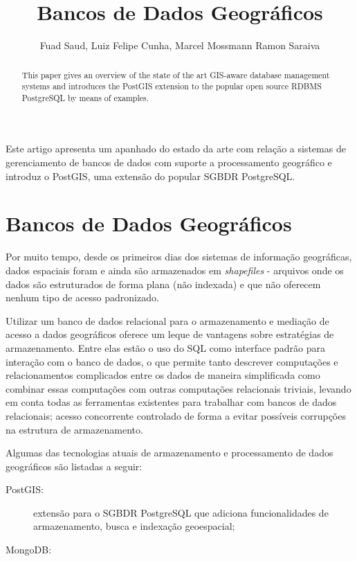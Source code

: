 \documentclass[12pt]{article}
\title{Bancos de Dados Geográficos}
\author{Fuad Saud\inst{1}, Luiz Felipe Cunha\inst{1}, Marcel Mossmann \inst{1} Ramon Saraiva\inst{1}}
\begin{document}
\maketitle

\begin{abstract}
  This paper gives an overview of the state of the art GIS-aware database
  management systems and introduces the PostGIS extension to the popular
  open source RDBMS PostgreSQL by means of examples.
\end{abstract}

\begin{resumo}
  Este artigo apresenta um apanhado do estado da arte com relação a sistemas de
  gerenciamento de bancos de dados com suporte a processamento geográfico e
  introduz o PostGIS, uma extensão do popular SGBDR PostgreSQL.
\end{resumo}


\section{Bancos de Dados Geográficos}

Por muito tempo, desde os primeiros dias dos sistemas de informação
geográficas, dados espaciais foram e ainda são armazenados em
\textit{shapefiles} - arquivos onde os dados são estruturados de forma plana
(não indexada) e que não oferecem nenhum tipo de acesso padronizado.

Utilizar um banco de dados relacional para o armazenamento e mediação de acesso
a dados geográficos oferece um leque de vantagens sobre estratégias de
armazenamento. Entre elas estão o uso do SQL como interface padrão para
interação com o banco de dados, o que permite tanto descrever computações e
relacionamentos complicados entre os dados de maneira simplificada como
combinar essas computações com outras computações relacionais triviais, levando
em conta todas as ferramentas existentes para trabalhar com bancos de dados
relacionais; acesso concorrente controlado de forma a evitar possíveis
corrupções na estrutura de armazenamento.

Algumas das tecnologias atuais de armazenamento e processamento de dados
geográficos são listadas a seguir:

\begin{description}
\item[PostGIS:] extensão para o SGBDR PostgreSQL que adiciona funcionalidades
  de armazenamento, busca e indexação geoespacial;
\item[MongoDB:]
\end{description}
\end{document}
